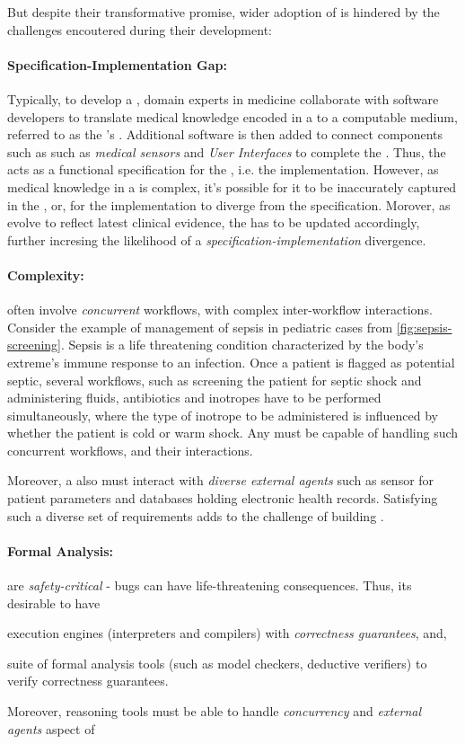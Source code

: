 But despite their transformative promise, wider adoption
of \CDSSs{} is hindered by the challenges encoutered during their development:

\paragraph{Specification-Implementation Gap:} Typically, to develop
a \CDSS{}, domain experts in medicine collaborate with software developers
to translate medical knowledge encoded in a \BPG{} to a computable medium,
referred to as the \CDSSs{}'s \BPGLogic. Additional software is then
added to connect components such as such as
\emph{medical sensors} and \emph{User Interfaces} to complete the
\CDSS{}. Thus, the \BPG{} acts as a functional specification for the \BPGLogic, i.e. the
implementation. However, as medical knowledge in a \BPG{} is complex,
it's possible for it to be inaccurately captured in the \BPGLogic{}, or,
for the implementation to diverge from the specification. Morover,
as \BPGs{} evolve to reflect latest clinical evidence, the \BPGLogic{} has
to be updated accordingly, further incresing the likelihood of a
\emph{specification-implementation} divergence.

\paragraph{Complexity:} \BPGs{} often involve \emph{concurrent} workflows,
with complex inter-workflow interactions. Consider the example of management
of sepsis in pediatric cases from \figurename{} \ref{fig:sepsis-screening}.
Sepsis is a life threatening condition characterized by the body's
extreme's immune response to an infection. Once a patient is flagged as
potential septic, several workflows, such as screening the patient for septic shock
and administering fluids, antibiotics and
inotropes have to be performed simultaneously, where the type of inotrope
to be administered is influenced by whether the patient is cold or warm shock.
Any \CDSS{} must be capable of handling such concurrent workflows, and their
interactions.

Moreover, a \CDSS{} also must interact with \emph{diverse external agents}
such as sensor for patient parameters  and databases holding electronic health
records. Satisfying such a diverse set of requirements adds to the challenge of
building \CDSSs{}.

\paragraph{Formal Analysis:} \CDSS{} are \emph{safety-critical} -
bugs can have life-threatening consequences. Thus, its desirable to have
\begin{enumerate*}[label=(\alph*)]
  \item execution engines (interpreters and compilers) with \emph{correctness guarantees}, and,
  \item suite of formal analysis tools (such as model checkers, deductive
    verifiers) to verify correctness guarantees.
\end{enumerate*}
Moreover, reasoning tools must be able to handle \emph{concurrency} and
\emph{external agents} aspect of \CDSSs{}

